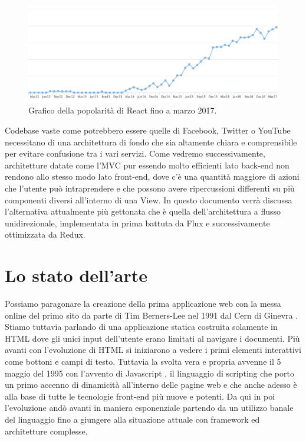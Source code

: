 \begin{figure}[h]
\centering 
\includegraphics[width=12.7cm]{./images/reactPopularity}
\caption{Grafico della popolarità di React fino a marzo 2017.}
\end{figure}

\noindent
Codebase vaste come potrebbero essere quelle di Facebook, Twitter o YouTube necessitano di una architettura di fondo che sia altamente chiara e comprensibile per evitare confusione tra i vari servizi.
Come vedremo successivamente, architetture datate come l'MVC pur essendo molto efficienti lato back-end non rendono allo stesso modo lato front-end, dove c'è una quantità maggiore di azioni che l'utente può intraprendere e che possono avere ripercussioni differenti su più componenti diversi all'interno di una View.
In questo documento verrà discussa l'alternativa attualmente più gettonata che è quella dell'architettura a flusso unidirezionale, implementata in prima battuta da Flux e successivamente ottimizzata da Redux.

\section{Lo stato dell'arte}
Possiamo paragonare la creazione della prima applicazione web con la messa online del primo sito da parte di Tim Berners-Lee nel 1991 dal Cern di Ginevra \cite{HuffingtonpostFirstWebsite}. Stiamo tuttavia parlando di una applicazione statica costruita solamente in HTML dove gli unici input dell'utente erano limitati al navigare i documenti. Più avanti con l'evoluzione di HTML si iniziarono a vedere i primi elementi interattivi come bottoni e campi di testo. Tuttavia la svolta vera e propria avvenne il 5 maggio del 1995 con l'avvento di Javascript \cite{W3cJavascriptHistory}, il linguaggio di scripting che porto un primo accenno di dinamicità all'interno delle pagine web e che anche adesso è alla base di tutte le tecnologie front-end più nuove e potenti. Da qui in poi l'evoluzione andò avanti in maniera esponenziale partendo da un utilizzo banale del linguaggio fino a giungere alla situazione attuale con framework ed architetture complesse.

